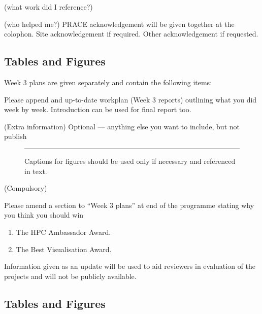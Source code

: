 \documentclass[a4paper, twoside]{article}
\newcommand{\highlight}[1]{\textcolor{prace-orange}{#1}}
\begin{document}
\begin{multicols}{3}
 (what work did I reference?)

 (who helped me?) PRACE acknowledgement will be given together at the colophon. Site acknowledgement if required. Other acknowledgement if requested.

\subsection*{Tables and Figures}

Week 3 plans are given separately and contain the following items:

 Please append and up-to-date workplan (Week 3 reports) outlining what you did week by week. Introduction can be used for final report too.

 (Extra information)
Optional --- anything else you want to include, but not publish

\noindent\begin{minipage}[H]{2\columnwidth+\columnsep}
  \begin{figure}[H]
  \centering
  \color{yellow}\rule{\linewidth}{3.8cm}\color{black}
  \caption{Captions for figures should be used only if necessary and referenced in text.}
\label{fig:my_label}
\end{figure}
\end{minipage}

 (Compulsory)

%
Please amend a section to ``Week 3 plans'' at end of the programme stating why you think you should win
\begin{enumerate}
  \item The HPC Ambassador Award.
  \item The Best Visualisation Award.
\end{enumerate}
Information given as an update will be used to aid reviewers in evaluation of the projects and will not be publicly available.



\subsection*{Tables and Figures}


\end{multicols}
\end{document}
